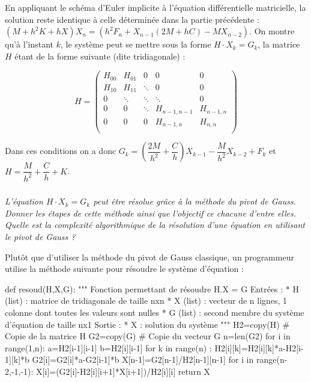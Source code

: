 \documentclass[10pt]{article}
\newif\ifprof
\begin{document}
En appliquant le schéma d'Euler implicite à l'équation différentielle matricielle, la solution reste identique à celle déterminée dans la partie précédente : $\left(M +h^2K+hX\right)X_{n}= \left(h^2F_n +X_{n-1}(2M+hC) -MX_{n-2} \right)$. On montre qu'à l'instant $k$, le système peut se mettre sous la forme $H\cdot X_k = G_k$, la matrice $H$ étant de la forme suivante (dite tridiagonale) :
\begin{minipage}[c]{.4\linewidth}
$$
H =
\begin{pmatrix}
H_{00}  & H_{01} &  0 & 0 & 0 \\
H_{10}  & H_{11} &  \ddots & 0 & 0 \\
0 & \ddots & \ddots & \ddots & 0 \\
0 & 0 & \ddots & H_{n-1,n-1} & H_{n-1,n} \\
0 & 0 & 0 & H_{n-1,n} & H_{n,n} \\
\end{pmatrix}
 $$
 \end{minipage} \hfill
\begin{minipage}[c]{.57\linewidth}
\begin{rem}
Dans ces conditions on a donc  $G_k = \left(\dfrac{2M}{h^2}+\dfrac{C}{h} \right)X_{k-1} - \dfrac{M}{h^2} X_{k-2} + F_k $ et $H = \dfrac{M}{h^2} + \dfrac{C}{h} + K$.
\end{rem}
 \end{minipage} 

\fi

\subparagraph{}
\textit{L'équation  $H\cdot X_k = G_k$ peut être résolue grâce à la méthode du pivot de Gauss. Donner les étapes de cette méthode ainsi que l'objectif ce chacune d'entre elles. Quelle est la complexité algorithmique de la résolution d'une équation en utilisant le pivot de Gauss ?}
\ifprof
\begin{corrige}
\end{corrige}
\else
\fi

\ifprof
\else

Plutôt que d'utiliser la méthode du pivot de Gauss classique, un programmeur utilise la méthode suivante pour résoudre le système d'équation : 
\begin{py}
\begin{python}
def resoud(H,X,G):
    """
    Fonction permettant de résoudre H.X = G
    Entrées : 
        * H (list) : matrice de tridiagonale de taille nxn
        * X (list) : vecteur de n lignes, 1 colonne dont toutes les valeurs sont nulles
        * G (list) : second membre du système d'équation de taille nx1
    Sortie : 
        * X : solution du système
    """
    H2=copy(H)  # Copie de la matrice H
    G2=copy(G)  # Copie du vecteur G
    n=len(G2)
    for i in range(1,n):
        a=H2[i-1][i-1]
        b=H2[i][i-1]
        for k in range(n) :
            H2[i][k]=H2[i][k]*a-H2[i-1][k]*b
        G2[i]=G2[i]*a-G2[i-1]*b
    X[n-1]=G2[n-1]/H2[n-1][n-1]
    for i in range(n-2,-1,-1):
        X[i]=(G2[i]-H2[i][i+1]*X[i+1])/H2[i][i]
    return X

\end{python}
\end{py}
\end{document}
